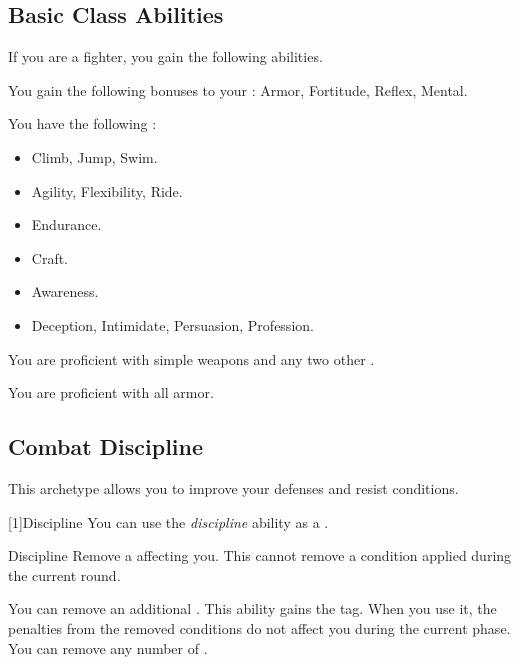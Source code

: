     \subsection{Basic Class Abilities}
        If you are a fighter, you gain the following abilities.

        You gain the following bonuses to your :  Armor,  Fortitude,  Reflex,  Mental.

        You have the following :
        \begin{itemize}
            \item {} Climb, Jump, Swim.
            \item {} Agility, Flexibility, Ride.
            \item {} Endurance.
            \item {} Craft.
            \item {} Awareness.
            \item {} Deception, Intimidate, Persuasion, Profession.
        \end{itemize}

        You are proficient with simple weapons and any two other .

        You are proficient with all armor.

    \subsection{Combat Discipline}
        This archetype allows you to improve your defenses and resist conditions.

        [1]{Discipline} You can use the \textit{discipline} ability as a .
        \begin{freeability}{Discipline}
            Remove a  affecting you.
            This cannot remove a condition applied during the current round.

            \rankline
             You can remove an additional .
             This ability gains the  tag.
            When you use it, the penalties from the removed conditions do not affect you during the current phase.
             You can remove any number of .
        \end{freeability}

